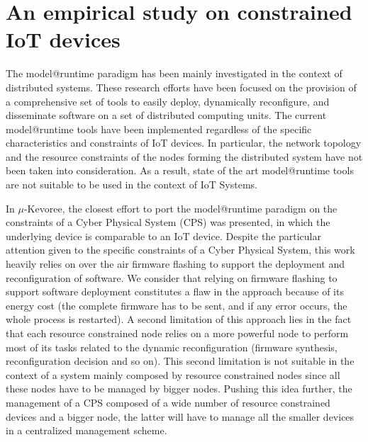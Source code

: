 \section{An empirical study on constrained IoT devices}
The model@runtime paradigm has been mainly investigated in the context of distributed systems. 
These research efforts have been focused on the provision of a comprehensive set of tools to easily deploy, dynamically reconfigure, and disseminate software on a set of distributed computing units.
The current model@runtime tools have been implemented regardless of the specific characteristics and constraints of IoT devices.
In particular, the network topology and the resource constraints of the nodes forming the distributed system have not been taken into consideration.
As a result, state of the art model@runtime tools are not suitable to be used in the context of IoT Systems.

In  \cite{fouquet2012dynamic} $\mu$-Kevoree, the closest effort to port the model@runtime paradigm on the constraints of a Cyber Physical System (CPS) was presented, in which the underlying device is comparable to an IoT device.
Despite the particular attention given to the specific constraints of a Cyber Physical System, this work heavily relies on over the air firmware flashing to support the deployment and reconfiguration of software. 
We consider that relying on firmware flashing to support software deployment constitutes a flaw in the approach because of its energy cost (the complete firmware has to be sent, and if any error occurs, the whole process is restarted).
A second limitation of this approach lies in the fact that each resource constrained node relies on a more powerful node to perform most of its tasks related to the dynamic reconfiguration (firmware synthesis, reconfiguration decision and so on).
This second limitation is not suitable in the context of a system mainly composed by resource constrained nodes since all these nodes have to be managed by bigger nodes.
Pushing this idea further, the management of a CPS composed of a wide number of resource constrained devices and a bigger node, the latter will have to manage all the smaller devices in a centralized management scheme.

